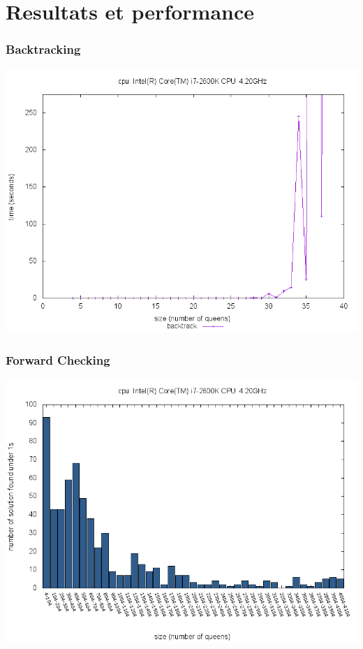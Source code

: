 \documentclass[9pt,a4paper]{beamer}
\begin{document}
\section{Resultats et performance}
\begin{frame}
	\frametitle{Backtracking}

	\hspace{0.8cm} \includegraphics[height=0.9\textheight]{images/plot_bt_i7.png}

\end{frame}

\begin{frame}
	\frametitle{Forward Checking}
	\hspace{0.8cm} \includegraphics[height=0.9\textheight]{images/plot_fw_i7.png}

\end{frame}
\end{document}
